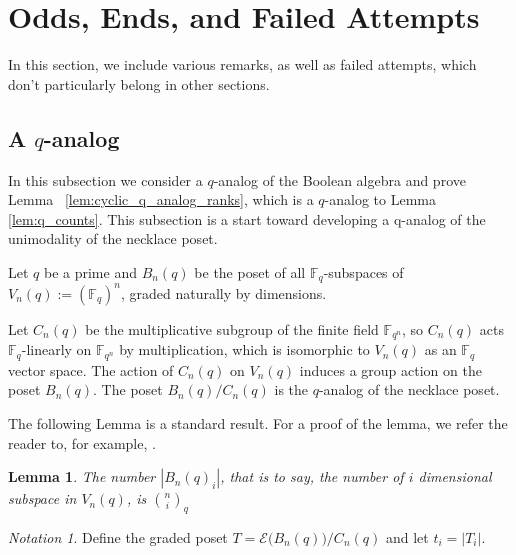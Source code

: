 \documentclass[10 pt]{amsart}
\theoremstyle{plain}
\newtheorem{lem}[thm]{Lemma}
\theoremstyle{definition}
\theoremstyle{remark}
\newtheorem{note}[thm]{Notation}
\numberwithin{equation}{section}
\newcommand\ssec{\subsection}
\newcommand\BF{{\mathbb F}}
\begin{document}
\section{Odds, Ends, and Failed Attempts}
\label{sec:additional_stuff}

In this section, we include various remarks, as well as failed attempts, which don't particularly belong in other sections.


\ssec{A $q$-analog}
\label{ssec:q_analog}

In this subsection we consider a $q$-analog of the Boolean algebra and prove Lemma ~\ref{lem:cyclic_q_analog_ranks}, which is a $q$-analog to Lemma \ref{lem:q_counts}. This subsection is a start toward developing a q-analog of the unimodality of the necklace poset.

Let $q$ be a prime and $B_n(q)$ be the poset of all $\BF_q$-subspaces of $V_n(q) := (\BF_q)^n$,  graded naturally by dimensions. 

Let $C_n(q)$ be the multiplicative subgroup of the finite field $\BF_{q^n}$, so $C_n(q)$ acts $\BF_q$-linearly on $\BF_{q^n}$ by multiplication, which is isomorphic to $V_n(q)$ as an $\BF_q$ vector space. The action of $C_n(q)$ on $V_n(q)$ induces a group action on the poset $B_n(q)$. The poset $B_n(q)/C_n(q)$ is the $q$-analog of the necklace poset. 

The following Lemma is a standard result. For a proof of the lemma, we refer the reader to, for example, \cite{enumerative_comb}.

\begin{lem}
\label{q:number_subspaces}
The number $|B_n(q)_i|$, that is to say, the number of $i$ dimensional subspace in $V_n(q)$, is ${n \choose i}_q$
\end{lem}

\begin{note}
Define the graded poset $T = \mathcal E \big(B_n(q)\big)/C_n(q)$ and let $t_i = |T_i|.$
\end{note}
\end{document}
